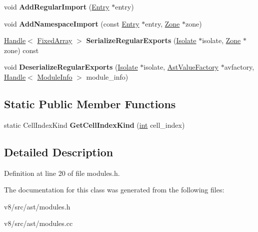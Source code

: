 \begin{DoxyCompactItemize}
\item 
\mbox{\label{classv8_1_1internal_1_1ModuleDescriptor_a57bacd16d5305ec95886125ee4ba2d1d}} 
void {\bfseries Add\+Regular\+Import} (\mbox{\hyperlink{structv8_1_1internal_1_1ModuleDescriptor_1_1Entry}{Entry}} $\ast$entry)
\item 
\mbox{\label{classv8_1_1internal_1_1ModuleDescriptor_acd4e41dda9ae18bf25d3a3ba6f56dc3e}} 
void {\bfseries Add\+Namespace\+Import} (const \mbox{\hyperlink{structv8_1_1internal_1_1ModuleDescriptor_1_1Entry}{Entry}} $\ast$entry, \mbox{\hyperlink{classv8_1_1internal_1_1Zone}{Zone}} $\ast$zone)
\item 
\mbox{\label{classv8_1_1internal_1_1ModuleDescriptor_af7186722a7d8c4fcbb61df5b8868a284}} 
\mbox{\hyperlink{classv8_1_1internal_1_1Handle}{Handle}}$<$ \mbox{\hyperlink{classv8_1_1internal_1_1FixedArray}{Fixed\+Array}} $>$ {\bfseries Serialize\+Regular\+Exports} (\mbox{\hyperlink{classv8_1_1internal_1_1Isolate}{Isolate}} $\ast$isolate, \mbox{\hyperlink{classv8_1_1internal_1_1Zone}{Zone}} $\ast$zone) const
\item 
\mbox{\label{classv8_1_1internal_1_1ModuleDescriptor_a955791762a312f33accbd5a4c7d2d105}} 
void {\bfseries Deserialize\+Regular\+Exports} (\mbox{\hyperlink{classv8_1_1internal_1_1Isolate}{Isolate}} $\ast$isolate, \mbox{\hyperlink{classv8_1_1internal_1_1AstValueFactory}{Ast\+Value\+Factory}} $\ast$avfactory, \mbox{\hyperlink{classv8_1_1internal_1_1Handle}{Handle}}$<$ \mbox{\hyperlink{classv8_1_1internal_1_1ModuleInfo}{Module\+Info}} $>$ module\+\_\+info)
\end{DoxyCompactItemize}
\subsection*{Static Public Member Functions}
\begin{DoxyCompactItemize}
\item 
\mbox{\label{classv8_1_1internal_1_1ModuleDescriptor_a981243233715792c374cb1b3dcc8562e}} 
static Cell\+Index\+Kind {\bfseries Get\+Cell\+Index\+Kind} (\mbox{\hyperlink{classint}{int}} cell\+\_\+index)
\end{DoxyCompactItemize}


\subsection{Detailed Description}


Definition at line 20 of file modules.\+h.



The documentation for this class was generated from the following files\+:\begin{DoxyCompactItemize}
\item 
v8/src/ast/modules.\+h\item 
v8/src/ast/modules.\+cc\end{DoxyCompactItemize}
